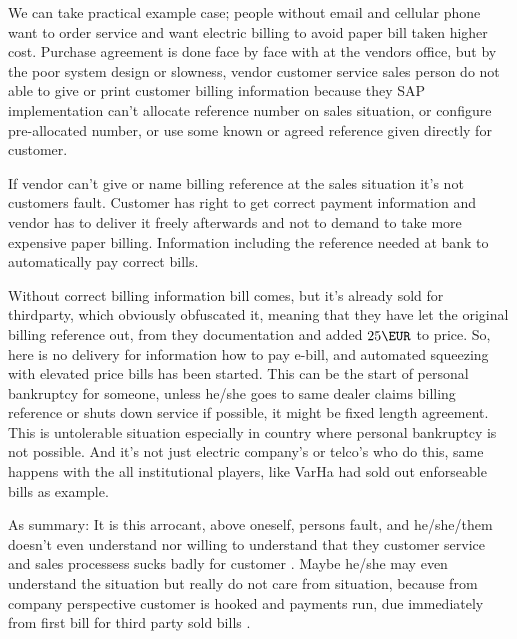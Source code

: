 We can take practical example case; people without email and cellular
phone\allowbreak\cite{HS202412141445} want to order service and want electric
billing to avoid paper bill taken higher cost. Purchase agreement is done face
by face with at the vendors office, but by the poor system design or slowness,
vendor customer service sales person do not able to give or print customer
billing information because they SAP implementation can't allocate reference
number on sales situation, or configure pre-allocated number, or use some
known or agreed reference given directly for customer.

If vendor can't give or name billing reference at the sales situation it's
not customers fault. Customer has right to get correct payment information
and vendor has to deliver it freely afterwards and not to demand to take
more expensive paper billing. Information including the reference needed at
bank to automatically pay correct bills.

Without correct billing information bill comes, but it's already sold for
thirdparty, which obviously obfuscated it, meaning that they have let the
original billing reference out, from they documentation and added $25\EUR$ to
price. So, here is no delivery for information how to pay e-bill, and
automated squeezing with elevated price bills has been started. This can be
the start of personal bankruptcy for someone, unless he/she goes to same
dealer claims billing reference or shuts down service if possible, it might
be fixed length agreement. This is untolerable situation especially in country
where personal bankruptcy \cite{PersonalBankruptcy} is not possible. And it's
not just electric company's or telco's who do this, same happens with the all
institutional players, like VarHa had sold out \cite{YLE202510211559}
enforseable bills \cite{YLE202510181426}\allowbreak\cite{YLE202510270829} as
example.

As summary: It is this arrocant, above oneself, persons fault, and he/she/them
doesn't even understand \cite{YLE202510231655} nor willing to understand
\cite{YLE202510271827}\allowbreak\cite{YLE202510282036} that they customer
service and sales processess sucks badly \cite{OwnFault} for customer
\cite{HS202412141445}. Maybe he/she may even understand the situation but
really do not care from situation, because from company perspective customer
is hooked and payments run, due immediately from first bill for third party
sold bills \cite{ItsekkyydenAika}.

